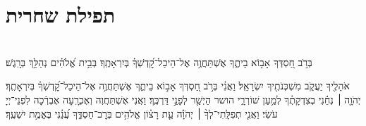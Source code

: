 \documentclass[twoside, openany, parskip=half, 11pt]{book}
\begin{document}

\setcounter{page}{1}

\vspace*{\fill}

\thispagestyle{empty}
\begin{Large}
\begin{center}
\end{center}
\end{Large}


\vspace*{\fill}


\centerlast

\chapter[תפילת שחרית]{ תפילת שחרית } 

\renewcommand{\thefootnote}{\roman{footnote}}  %
\setlength{\parskip}{0.75em}

\\
בְּרֹ֣ב חַ֭סְדְּךָ אָב֣וֹא בֵיתֶ֑ךָ אֶשְׁתַּחֲוֶ֥ה אֶל־הֵיכַל־קׇ֝דְשְׁךָ֗ בְּיִרְאָתֶֽךָ׃
%
בְּבֵ֥ית אֱ֝לֹהִ֗ים נְהַלֵּ֥ךְ בְּרָֽגֶשׁ׃ 
 	 

 אֹהָלֶ֖יךָ יַעֲקֹ֑ב מִשְׁכְּנֹתֶ֖יךָ יִשְׂרָאֵֽל׃
וַאֲנִ֗י בְּרֹ֣ב חַ֭סְדְּךָ אָב֣וֹא בֵיתֶ֑ךָ אֶשְׁתַּחֲוֶ֥ה אֶל־הֵיכַל־קׇ֝דְשְׁךָ֗ בְּיִרְאָתֶֽךָ׃
יְהֹוָ֤ה ׀ נְחֵ֬נִי בְצִדְקָתֶ֗ךָ לְמַ֥עַן שׁוֹרְרָ֑י הושר הַיְשַׁ֖ר לְפָנַ֣י דַּרְכֶּֽךָ׃ 
וַאֲנִי אֶשְׁתַּחֲוֶה וְאֶכְרָֽעָה אֶבְרְֿכָה לִפְנֵי־יְיָ עֹשִׂי׃
וַאֲנִ֤י
%
 תְפִלָּֽתִי־לְךָ֨ ׀ יְהֹוָ֡ה עֵ֤ת רָצ֗וֹן אֱלֹהִ֥ים בְּרׇב־חַסְדֶּ֑ךָ עֲ֝נֵ֗נִי בֶּאֱמֶ֥ת יִשְׁעֶֽךָ׃
\end{document}
